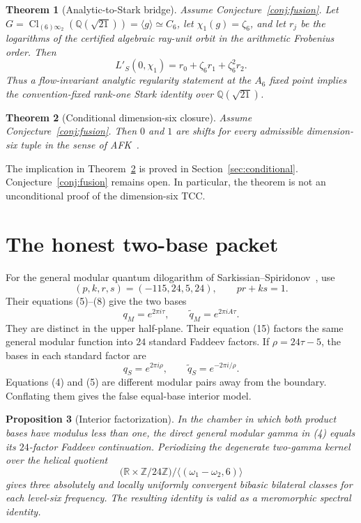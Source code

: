 \documentclass[11pt]{article}
\newtheorem{theorem}{Theorem}
\newtheorem{proposition}[theorem]{Proposition}
\newcommand{\Q}{\mathbb Q}
\newcommand{\Z}{\mathbb Z}
\begin{document}
\begin{theorem}[Analytic-to-Stark bridge]\label{thm:stark}
Assume Conjecture~\ref{conj:fusion}.  Let
$G=\operatorname{Cl}_{(6)\infty_2}(\Q(\sqrt{21}))
=\langle g\rangle\simeq C_6$, let
$\chi_1(g)=\zeta_6$, and let $r_j$ be the logarithms of the certified
algebraic ray-unit orbit in the arithmetic Frobenius order.  Then
\[
 L'_S(0,\chi_1)
 =r_0+\zeta_6r_1+\zeta_6^2r_2.
\tag{3}
\]
Thus a flow-invariant analytic regularity statement at the
$A_6$ fixed point implies the convention-fixed rank-one Stark
identity over $\Q(\sqrt{21})$.
\end{theorem}

\begin{theorem}[Conditional dimension-six closure]\label{thm:conditional}
Assume Conjecture~\ref{conj:fusion}.  Then $0$ and $1$ are shifts for
every admissible dimension-six tuple in the sense of
AFK~\cite[Definition 1.34 and equation (1.49)]{AFK}.
\end{theorem}

The implication in Theorem~\ref{thm:conditional} is proved in
Section~\ref{sec:conditional}.  Conjecture~\ref{conj:fusion} remains
open.  In particular, the theorem is not an unconditional proof of the
dimension-six TCC.

\section{The honest two-base packet}\label{sec:two-base}

For the general modular quantum dilogarithm of
Sarkissian--Spiridonov~\cite{SS}, use
\[
 (p,k,r,s)=(-115,24,5,24),\qquad pr+ks=1.
\tag{4}
\]
Their equations (5)--(8) give the two bases
\[
 q_M=e^{2\pi i\tau},\qquad
 \widetilde q_M=e^{2\pi iA\tau}.
\tag{5}
\]
They are distinct in the upper half-plane.  Their equation (15)
factors the same general modular function into $24$ standard Faddeev
factors.  If $\rho=24\tau-5$, the bases in each standard factor are
\[
 q_S=e^{2\pi i\rho},\qquad
 \widetilde q_S=e^{-2\pi i/\rho}.
\tag{6}
\]
Equations (4) and (5) are different modular pairs away from the
boundary.  Conflating them gives the false equal-base interior model.

\begin{proposition}[Interior factorization]\label{prop:interior}
In the chamber in which both product bases have modulus less than one,
the direct general modular gamma in (4) equals its $24$-factor
Faddeev continuation.  Periodizing the degenerate two-gamma kernel
over the helical quotient
\[
 \bigl(\mathbb R\times\Z/24\Z\bigr)/
 \langle(\omega_1-\omega_2,6)\rangle
\tag{7}
\]
gives three absolutely and locally uniformly convergent bibasic
bilateral classes for each level-six frequency.  The resulting
identity is valid as a meromorphic spectral identity.
\end{proposition}
\end{document}
